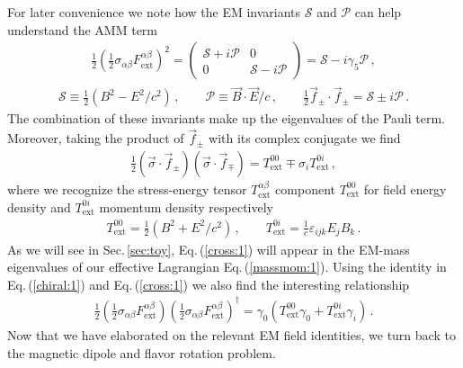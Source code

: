 \documentclass{ws-ijmpa}
\newcommand{\req}[1]{Eq.\,(\ref{#1})}
\newcommand{\rsec}[1]{Sec.\,{\ref{#1}}}
\begin{document}
For later convenience we note how the EM invariants $\mathcal{S}$ and $\mathcal{P}$ can help understand the AMM term 
\begin{align}
\label{invar:1}
\frac{1}{2}\left(\frac{1}{2}\sigma_{\alpha\beta}F^{\alpha\beta}_\mathrm{ext}\right)^{2}=
\begin{pmatrix}
\mathcal{S}+i\mathcal{P} & 0\\
0 & \mathcal{S}-i\mathcal{P}
\end{pmatrix}=\mathcal{S}-i\gamma_{5}\mathcal{P}\,,
\end{align}
%
\begin{align}
\mathcal{S}\equiv\frac{1}{2}\left(B^{2}-E^{2}/c^{2}\right)\,,\qquad
\mathcal{P}\equiv\vec{B}\cdot\vec{E}/c\,,\qquad
\frac{1}{2}\vec{f}_{\pm}\cdot\vec{f}_{\pm}=\mathcal{S}\pm i\mathcal{P}\,.
\end{align}
The combination of these invariants make up the eigenvalues of the Pauli term. Moreover, taking the product of $\vec{f}_{\pm}$ with its complex conjugate we find
\begin{align}
\label{cross:1}
\frac{1}{2}\left(\vec{\sigma}\cdot\vec{f}_{\pm}\right)\left(\vec{\sigma}\cdot\vec{f}_{\mp}\right)=T_\mathrm{ext}^{00}\mp \sigma_{i}T_\mathrm{ext}^{0i}\,,
\end{align}
where we recognize the stress-energy tensor $T_\mathrm{ext}^{\alpha\beta}$ component $T_\mathrm{ext}^{00}$ for field energy density and $T_\mathrm{ext}^{0i}$ momentum density respectively
\begin{align}
T_\mathrm{ext}^{00}=\frac{1}{2}\left(B^{2}+E^{2}/c^{2}\right)\,,\qquad
T_\mathrm{ext}^{0i}=\frac{1}{c}\varepsilon_{ijk}E_{j}B_{k}\,.
\end{align}
As we will see in \rsec{sec:toy}, \req{cross:1} will appear in the EM-mass eigenvalues of our effective Lagrangian \req{massmom:1}. Using the identity in \req{chiral:1} and \req{cross:1} we also find the interesting relationship
\begin{align}
\label{cross:2}
\frac{1}{2}\left(\frac{1}{2}\sigma_{\alpha\beta}F^{\alpha\beta}_\mathrm{ext}\right)\left(\frac{1}{2}\sigma_{\alpha\beta}F^{\alpha\beta}_\mathrm{ext}\right)^{\dag}=
\gamma_{0}\left(T_\mathrm{ext}^{00}\gamma_{0}+T_\mathrm{ext}^{0i}\gamma_{i}\right)\,.
\end{align}
Now that we have elaborated on the relevant EM field identities, we turn back to the magnetic dipole and flavor rotation problem.

\end{document}
